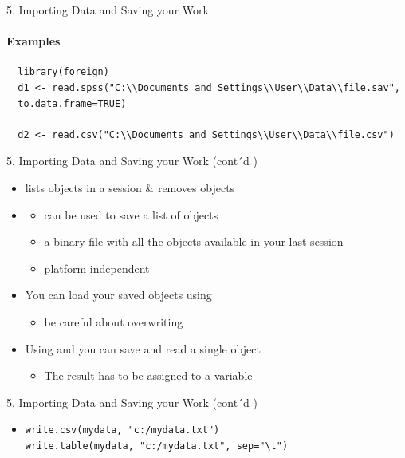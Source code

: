 \documentclass[14pt, aspectratio=169, sectionpage=simple, xclolor=table]{beamer}
\begin{document}
\begin{frame}[fragile]{5. Importing Data and Saving your Work}
\framesubtitle{Examples}
{\small
  \begin{verbatim}
  library(foreign)
  d1 <- read.spss("C:\\Documents and Settings\\User\\Data\\file.sav",
  to.data.frame=TRUE)
  
  d2 <- read.csv("C:\\Documents and Settings\\User\\Data\\file.csv") 
  \end{verbatim}
}
\end{frame}
\begin{frame}{5. Importing Data and Saving your Work (cont´d )}
\begin{itemize}
\item {} lists \R objects in a session \&  removes objects
\nl
\item {}
\begin{itemize}
	\item can be used to save a list of \R objects
	\item a binary file with all the objects available in your last \R session
	\item platform independent
	\nl
\end{itemize}
\item You can load your saved \R objects using 
\begin{itemize}
	\item be careful about overwriting
\end{itemize}
\item Using  and  you can save and read a single \R object
\begin{itemize}
	\item The result has to be assigned to a variable
\end{itemize}
\end{itemize}
\end{frame}


\begin{frame}[fragile]{5. Importing Data and Saving your Work (cont´d )}
\begin{itemize}
\item {}
\begin{verbatim}
write.csv(mydata, "c:/mydata.txt")
write.table(mydata, "c:/mydata.txt", sep="\t")
\end{verbatim}
\end{itemize}
\end{frame}
\end{document}
